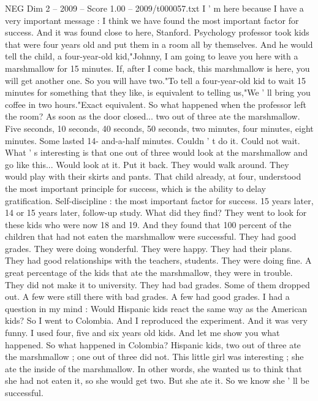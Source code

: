 \begin{textsample}{NEG Dim 2 – 2009 – Score 1.00 – 2009/t000057.txt}  \label{ex:f2_neg_007}
I ' m here because I have a very important message : I think we have found the most important factor for success.
And it was found close to here, Stanford.
Psychology professor took kids that were four years old and put them in a room all by themselves.
And he would tell the child, a four-year-old kid,"Johnny, I am going to leave you here with a marshmallow for 15 minutes.
If, after I come back, this marshmallow is here, you will get another one.
So you will have two."To tell a four-year-old kid to wait 15 minutes for something that they like, is equivalent to telling us,"We ' ll bring you coffee in two hours."Exact equivalent.
So what happened when the professor left the room?
As soon as the door closed... two out of three ate the marshmallow.
Five seconds, 10 seconds, 40 seconds, 50 seconds, two minutes, four minutes, eight minutes.
Some lasted 14- and-a-half minutes.
Couldn ' t do it.
Could not wait.
What ' s interesting is that one out of three would look at the marshmallow and go like this...
Would look at it.
Put it back.
They would walk around.
They would play with their skirts and pants.
That child already, at four, understood the most important principle for success, which is the ability to delay gratification.
Self-discipline : the most important factor for success. 15 years later, 14 or 15 years later, follow-up study.
What did they find?
They went to look for these kids who were now 18 and 19.
And they found that 100 percent of the children that had not eaten the marshmallow were successful.
They had good grades.
They were doing wonderful.
They were happy.
They had their plans.
They had good relationships with the teachers, students.
They were doing fine.
A great percentage of the kids that ate the marshmallow, they were in trouble.
They did not make it to university.
They had bad grades.
Some of them dropped out.
A few were still there with bad grades.
A few had good grades.
I had a question in my mind : Would Hispanic kids react the same way as the American kids?
So I went to Colombia.
And I reproduced the experiment.
And it was very funny.
I used four, five and six years old kids.
And let me show you what happened.
So what happened in Colombia?
Hispanic kids, two out of three ate the marshmallow ; one out of three did not.
This little girl was interesting ; she ate the inside of the marshmallow.
In other words, she wanted us to think that she had not eaten it, so she would get two.
But she ate it.
So we know she ' ll be successful.

\end{textsample}
